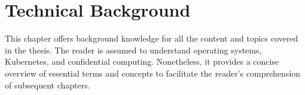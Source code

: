 \chapter{Technical Background}
\label{sec:state}







This chapter offers background knowledge for all the content and topics covered in the thesis. The reader is assumed to understand operating systems, Kubernetes\cite*{k8s}, and confidential computing. Nonetheless, it provides a concise overview of essential terms and concepts to facilitate the reader's 
comprehension of subsequent chapters.


